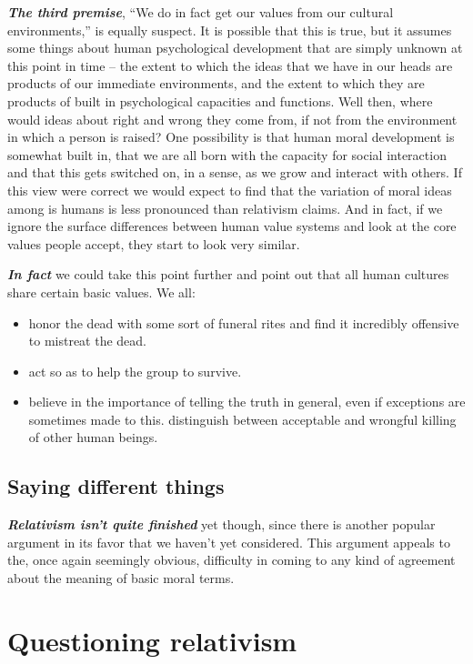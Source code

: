 \documentclass[12pt, openany]{book}
\providecommand{\tightlist}{%
  \setlength{\itemsep}{0pt}\setlength{\parskip}{0pt}}
\begin{document}
\textbf{\emph{The third premise}}, ``We do in fact get our values from our cultural environments,'' is equally suspect. It is possible that this is true, but it assumes some things about human psychological development that are simply unknown at this point in time -- the extent to which the ideas that we have in our heads are products of our immediate environments, and the extent to which they are products of built in psychological capacities and functions. Well then, where would ideas about right and wrong they come from, if not from the environment in which a person is raised? One possibility is that human moral development is somewhat built in, that we are all born with the capacity for social interaction and that this gets switched on, in a sense, as we grow and interact with others. If this view were correct we would expect to find that the variation of moral ideas among is humans is less pronounced than relativism claims. And in fact, if we ignore the surface differences between human value systems and look at the core values people accept, they start to look very similar.

\textbf{\emph{In fact}} we could take this point further and point out that all human cultures share certain basic values. We all:

\begin{itemize}
\tightlist
\item
  honor the dead with some sort of funeral rites and find it incredibly offensive to mistreat the dead.
\item
  act so as to help the group to survive.
\item
  believe in the importance of telling the truth in general, even if exceptions are sometimes made to this. distinguish between acceptable and wrongful killing of other human beings.
\end{itemize}

\hypertarget{saying-different-things}{%
\subsection*{Saying different things}\label{saying-different-things}}


\textbf{\emph{Relativism isn't quite finished}} yet though, since there is another popular argument in its favor that we haven't yet considered. This argument appeals to the, once again seemingly obvious, difficulty in coming to any kind of agreement about the meaning of basic moral terms.

\hypertarget{questioning-relativism}{%
\section{Questioning relativism}\label{questioning-relativism}}
\end{document}
